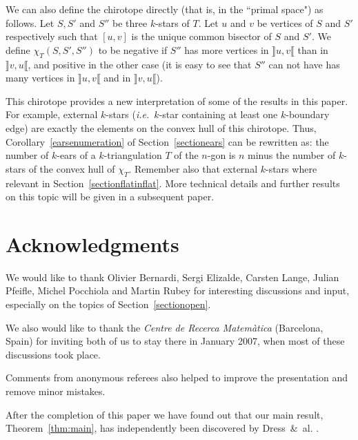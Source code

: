 \documentclass[12pt]{amsart}
\begin{document}
We can also define the chirotope directly (that is, in the ``primal space") as follows. Let $S,S'$ and $S''$ be three $k$-stars of $T$. Let $u$ and $v$ be vertices of $S$ and $S'$ respectively such that $[u,v]$ is the unique common bisector of $S$ and $S'$. We define $\chi_T(S,S',S'')$ to be negative if $S''$ has more vertices in $\rrbracket u,v\llbracket$ than in $\rrbracket v,u\llbracket$, and positive in the other case (it is easy to see that $S''$ can not have has many vertices in $\rrbracket u,v\llbracket$ and in $\rrbracket v,u\llbracket$).

This chirotope provides a new interpretation of some of the results in this paper. For example, external $k$-stars ({\it i.e.}~$k$-star containing at least one $k$-boundary edge) are exactly the elements on the convex hull of this chirotope. Thus, Corollary~\ref{earsenumeration} of Section~\ref{sectionears} can be rewritten as: the number of $k$-ears of a $k$-triangulation $T$ of the $n$-gon is $n$ minus the number of $k$-stars of the convex hull of $\chi_T$. Remember also that external $k$-stars where relevant in Section~\ref{sectionflatinflat}. More technical details and further results on this topic will be given in a subsequent paper.







\section*{Acknowledgments}

We would like to thank Olivier Bernardi, Sergi Elizalde, Carsten Lange, Julian Pfeifle, Michel Pocchiola and Martin Rubey for interesting discussions and input, especially on the topics of Section~\ref{sectionopen}.

We also would like to thank the \emph{Centre de Recerca Matem\`atica} (Bar\-celona, Spain) for inviting both of us to stay there in January 2007, when most of these discussions took place.

Comments from anonymous referees also helped to improve the presentation and remove minor mistakes.

After the completion of this paper we have found out that our main result, Theorem~\ref{thm:main}, has
independently been discovered by Dress~\&~al. \cite{dgjm-scclahp-07}.




\end{document}
